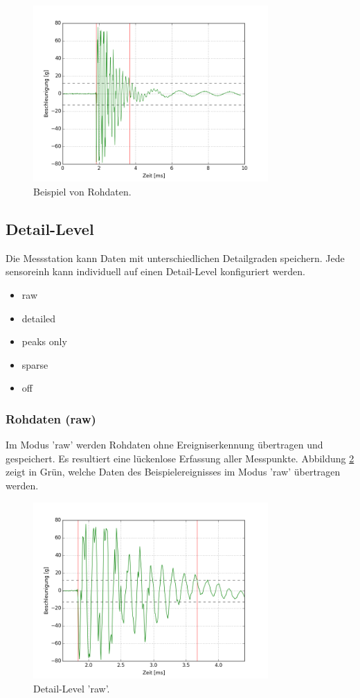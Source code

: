 \begin{figure}
	\centering
		\includegraphics[width=0.8\textwidth]{images/raw.png}
	\caption{Beispiel von Rohdaten.}
	\label{fig.impactraw}
\end{figure}

\subsection{Detail-Level}\label{ssec.detaillevel}
Die Messstation kann Daten mit unterschiedlichen Detailgraden speichern. Jede \gls{sensoreinh} kann individuell auf einen Detail-Level konfiguriert werden.

\begin{itemize}
\item raw
\item detailed
\item peaks only
\item sparse
\item off
\end{itemize}


\subsubsection{Rohdaten (raw)}
Im Modus 'raw' werden Rohdaten ohne Ereigniserkennung übertragen und gespeichert. Es resultiert eine lückenlose Erfassung aller Messpunkte. Abbildung \ref{fig.detailraw} zeigt in Grün, welche Daten des Beispielereignisses im Modus 'raw' übertragen werden.


\begin{figure}
	\centering
		\includegraphics[width=0.8\textwidth]{images/rawshort.png}
	\caption{Detail-Level 'raw'.}
	\label{fig.detailraw}
\end{figure}

